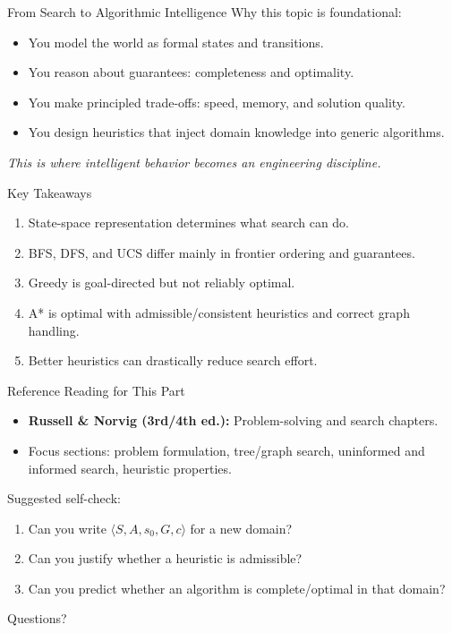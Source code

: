 \documentclass[10pt]{beamer}
\begin{document}
\begin{frame}{From Search to Algorithmic Intelligence}
    Why this topic is foundational:
    \begin{itemize}
        \item You model the world as formal states and transitions.
        \item You reason about guarantees: completeness and optimality.
        \item You make principled trade-offs: speed, memory, and solution quality.
        \item You design heuristics that inject domain knowledge into generic algorithms.
    \end{itemize}
    \vspace{0.2cm}
    \textit{This is where intelligent behavior becomes an engineering discipline.}
\end{frame}

\begin{frame}{Key Takeaways}
    \begin{enumerate}
        \item State-space representation determines what search can do.
        \item BFS, DFS, and UCS differ mainly in frontier ordering and guarantees.
        \item Greedy is goal-directed but not reliably optimal.
        \item A* is optimal with admissible/consistent heuristics and correct graph handling.
        \item Better heuristics can drastically reduce search effort.
    \end{enumerate}
\end{frame}

\begin{frame}{Reference Reading for This Part}
    \begin{itemize}
        \item \textbf{Russell \& Norvig (3rd/4th ed.):} Problem-solving and search chapters.
        \item Focus sections: problem formulation, tree/graph search, uninformed and informed search, heuristic properties.
    \end{itemize}
    \vspace{0.25cm}
    Suggested self-check:
    \begin{enumerate}
        \item Can you write $\langle S, A, s_0, G, c \rangle$ for a new domain?
        \item Can you justify whether a heuristic is admissible?
        \item Can you predict whether an algorithm is complete/optimal in that domain?
    \end{enumerate}
\end{frame}

\begin{frame}[standout]
    Questions?
\end{frame}
\end{document}
